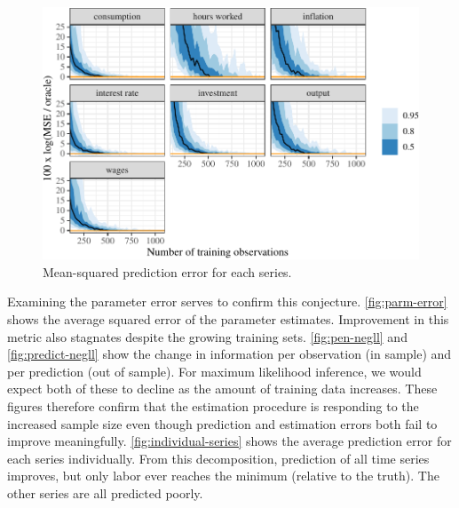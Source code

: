 \documentclass[11pt]{article}
\begin{document}
\begin{figure}[t]

{\centering \includegraphics{gfx/individual-series-1} 

}

\caption{Mean-squared prediction error for each series.}\label{fig:individual-series}
\end{figure}

Examining the parameter error serves to confirm this conjecture.
\autoref{fig:parm-error} shows the average squared error of the
parameter estimates. Improvement in this metric also stagnates despite
the growing training sets. \autoref{fig:pen-negll} and
\autoref{fig:predict-negll} show the change in information per
observation (in sample) and per prediction (out of sample). For maximum
likelihood inference, we would expect both of these to decline as the
amount of training data increases. These figures therefore confirm that
the estimation procedure is responding to the increased sample size even
though prediction and estimation errors both fail to improve
meaningfully. \autoref{fig:individual-series} shows the average
prediction error for each series individually. From this decomposition,
prediction of all time series improves, but only labor ever reaches the
minimum (relative to the truth). The other series are all predicted
poorly.
\end{document}
